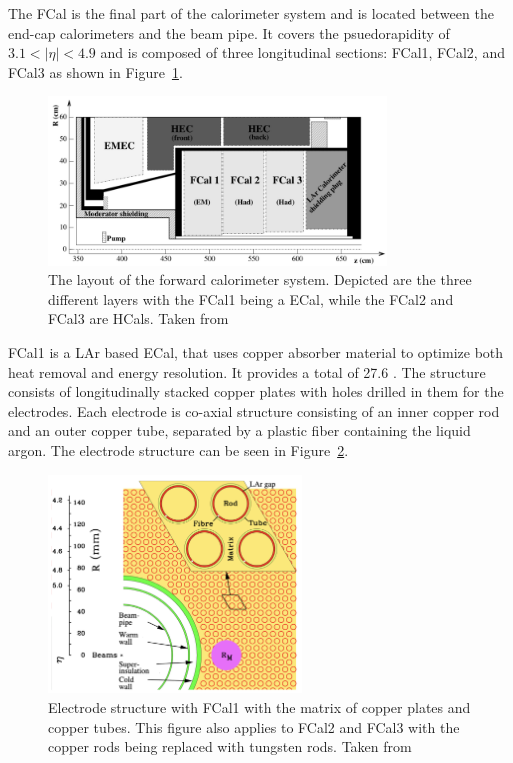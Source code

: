 The FCal is the final part of the calorimeter system and is located between the end-cap calorimeters and the beam pipe. It covers the psuedorapidity of $3.1 < |\eta| < 4.9$ and is composed of three longitudinal sections: FCal1, FCal2, and FCal3 as shown in Figure~\ref{fig:forward_detector_layout}. 

\begin{figure}[htp]
    \centering
    \includegraphics[width=0.8\textwidth]{figures/atlas/atlas_fcal_breakdown.png}
    \caption{The layout of the forward calorimeter system. Depicted are the three different layers with the FCal1 being a ECal, while the FCal2 and FCal3 are HCals. Taken from~\cite{atlas_collaboration_paper}}\label{fig:forward_detector_layout}
\end{figure}

FCal1 is a LAr based ECal, that uses copper absorber material to optimize both heat removal and energy resolution. It provides a total of 27.6 \radlength{}. The structure consists of longitudinally stacked copper plates with holes drilled in them for the electrodes. Each electrode is co-axial structure consisting of an inner copper rod and an outer copper tube, separated by a plastic fiber containing the liquid argon. The electrode structure can be seen in Figure~\ref{fig:atlas_fcal_electrode}. 

\begin{figure}[htp]
    \centering
    \includegraphics[width=0.6\textwidth]{figures/atlas/atlas_fcal_electrode.png}
    \caption{Electrode structure with FCal1 with the matrix of copper plates and copper tubes. This figure also applies to FCal2 and FCal3 with the copper rods being replaced with tungsten rods. Taken from~\cite{atlas_collaboration_paper}}\label{fig:atlas_fcal_electrode}
\end{figure}

